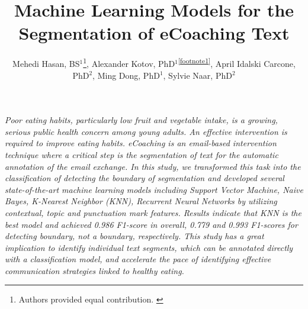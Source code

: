 \documentclass{amia}
\begin{document}
\title{Machine Learning Models for the Segmentation of eCoaching Text}

\author{Mehedi Hasan, BS$^{1}$\footnote[1]{Authors provided equal contribution. \label{footnote1}}, Alexander Kotov, PhD$^{1}$\textsuperscript{\ref{footnote1}}, April Idalski Carcone, PhD$^{2}$, Ming Dong, PhD$^{1}$, Sylvie Naar, PhD$^{2}$}


\maketitle

\textit{Poor eating habits, particularly low fruit and vegetable intake, is a growing, serious public health concern among young adults. An effective intervention is required to improve eating habits. eCoaching is an email-based intervention technique where a critical step is the segmentation of text for the automatic annotation of the email exchange. In this study, we transformed this task into the classification of detecting the boundary of segmentation and developed several state-of-the-art machine learning models including Support Vector Machine, Naive Bayes, K-Nearest Neighbor (KNN), Recurrent Neural Networks by utilizing contextual, topic and punctuation mark features. Results indicate that KNN is the best model and achieved 0.986 F1-score in overall, 0.779 and 0.993 F1-scores for detecting boundary, not a boundary, respectively. This study has a great implication to identify individual text segments, which can be annotated directly with a classification model, and accelerate the pace of identifying effective communication strategies linked to healthy eating.}
\end{document}
